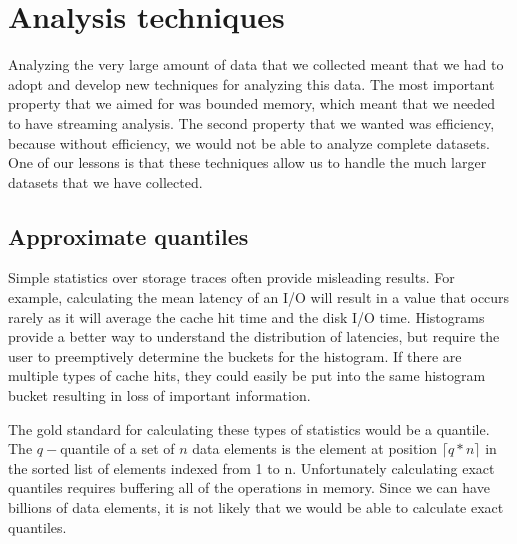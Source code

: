 \section{Analysis techniques}
\label{sec:analysis-techniques}

Analyzing the very large amount of data that we collected meant that
we had to adopt and develop new techniques for analyzing this data.
The most important property that we aimed for was bounded memory,
which meant that we needed to have streaming analysis.  The second
property that we wanted was efficiency, because without efficiency, we
would not be able to analyze complete datasets.  One of our lessons is
that these techniques allow us to handle the much larger datasets that
we have collected.

\subsection{Approximate quantiles}

Simple statistics over storage traces often provide misleading
results.  For example, calculating the mean latency of an I/O will
result in a value that occurs rarely as it will average the cache hit
time and the disk I/O time.  Histograms provide a better way to
understand the distribution of latencies, but require the user to
preemptively determine the buckets for the histogram.  If there are
multiple types of cache hits, they could easily be put into the same
histogram bucket resulting in loss of important information.

The gold standard for calculating these types of statistics would be a
quantile.  The $q-$quantile of a set of $n$ data elements is the
element at position $\lceil q*n\rceil$ in the sorted list of elements
indexed from 1 to n.  Unfortunately calculating exact quantiles
requires buffering all of the operations in memory.  Since we can have
billions of data elements, it is not likely that we would be able to
calculate exact quantiles.


